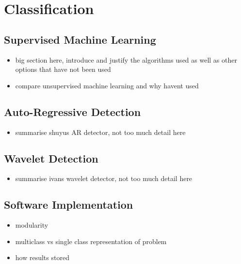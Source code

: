 \section{Classification}
\label{sec:pl-clf}

    \subsection{Supervised Machine Learning}
    \label{subsec:pl-clf-sup}
        \begin{itemize}
            \item{big section here, introduce and justify the algorithms used as well as other options that have not been used}
            \item{compare unsupervised machine learning and why havent used}
        \end{itemize}
    
    \subsection{Auto-Regressive Detection}
    \label{subsec:pl-clf-ar}
        \begin{itemize}
            \item{summarise shuyus AR detector, not too much detail here}
        \end{itemize}
    
    \subsection{Wavelet Detection}
    \label{subsec:pl-clf-wavelet}
        \begin{itemize}
            \item{summarise ivans wavelet detector, not too much detail here}
        \end{itemize}

    \subsection{Software Implementation}
    \label{subsec:pl-clf-software}
        \begin{itemize}
            \item{modularity}
            \item{multiclass vs single class representation of problem}
            \item{how results stored}
        \end{itemize}